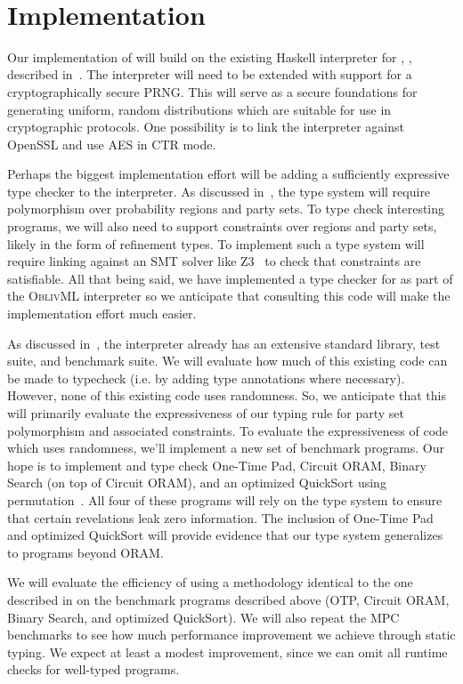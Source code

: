  \\

\section{Implementation}
\label{sec:proposal-impl}

Our implementation of \lang will build on the existing Haskell interpreter for \mpc, \system, described in~.
The interpreter will need to be extended with support for a cryptographically secure PRNG. This will serve as a secure foundations for
generating uniform, random distributions which are suitable for use in cryptographic protocols. One possibility is to link the interpreter
against OpenSSL and use AES in CTR mode.

Perhaps the biggest implementation effort will be adding a sufficiently expressive type checker to the interpreter. As discussed
in~, the type system will require polymorphism over probability regions and party sets. To
type check interesting programs, we will also need to support constraints over regions and party sets, likely in the form of
refinement types. To implement such a type system will require linking against an SMT solver like Z3~\cite{} to check that
constraints are satisfiable. All that being said, we have implemented a type checker for \obliv as part of the \textsc{OblivML}
interpreter so we anticipate that consulting this code will make the implementation effort much easier.

As discussed in~, the \system interpreter already has an extensive standard library, test suite, and benchmark
suite. We will evaluate how much of this existing \system code can be made to typecheck (i.e. by adding type annotations where necessary).
However, none of this existing code uses randomness. So, we anticipate that this will primarily evaluate the expressiveness of our
typing rule for party set polymorphism and associated constraints. To evaluate the expressiveness of code which uses randomness,
we'll implement a new set of benchmark programs. Our hope is to implement and type check One-Time Pad, Circuit ORAM,
Binary Search (on top of Circuit ORAM), and an optimized QuickSort using permutation~\cite{hamada}. All four of these programs
will rely on the type system to ensure that certain revelations leak zero information. The inclusion of One-Time
Pad and optimized QuickSort will provide evidence that our type system generalizes to programs beyond ORAM.

We will evaluate the efficiency of \lang using a methodology identical to the one described in  on the
benchmark programs described above (OTP, Circuit ORAM, Binary Search, and optimized QuickSort). We will also repeat the MPC
benchmarks to see how much performance improvement we achieve through static typing. We expect at least a modest improvement,
since we can omit all runtime checks for well-typed programs.
